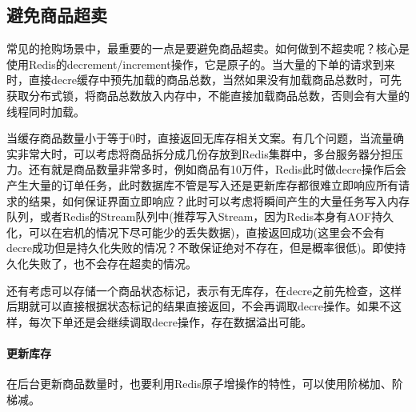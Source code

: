 \documentclass[../../../interview-questions.tex]{subfiles}
\begin{document}
\subsection{避免商品超卖}

常见的抢购场景中，最重要的一点是要避免商品超卖。如何做到不超卖呢？核心是使用Redis的decrement/increment操作，它是原子的。当大量的下单的请求到来时，直接decre缓存中预先加载的商品总数，当然如果没有加载商品总数时，可先获取分布式锁，将商品总数放入内存中，不能直接加载商品总数，否则会有大量的线程同时加载。

当缓存商品数量小于等于0时，直接返回无库存相关文案。有几个问题，当流量确实非常大时，可以考虑将商品拆分成几份存放到Redis集群中，多台服务器分担压力。还有就是商品数量非常多时，例如商品有10万件，Redis此时做decre操作后会产生大量的订单任务，此时数据库不管是写入还是更新库存都很难立即响应所有请求的结果，如何保证界面立即响应？此时可以考虑将瞬间产生的大量任务写入内存队列，或者Redis的Stream队列中(推荐写入Stream，因为Redis本身有AOF持久化，可以在宕机的情况下尽可能少的丢失数据)，直接返回成功(这里会不会有decre成功但是持久化失败的情况？不敢保证绝对不存在，但是概率很低)。即使持久化失败了，也不会存在超卖的情况。

还有考虑可以存储一个商品状态标记，表示有无库存，在decre之前先检查，这样后期就可以直接根据状态标记的结果直接返回，不会再调取decre操作。如果不这样，每次下单还是会继续调取decre操作，存在数据溢出可能。

\paragraph{更新库存}

在后台更新商品数量时，也要利用Redis原子增操作的特性，可以使用阶梯加、阶梯减。
\end{document}
